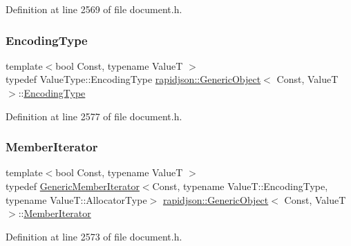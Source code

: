 Definition at line 2569 of file document.\+h.

\mbox{\label{classrapidjson_1_1_generic_object_ac412c8d073aa02f622b3904e4195425c}} 
\subsubsection{\texorpdfstring{EncodingType}{EncodingType}}
{\footnotesize\ttfamily template$<$bool Const, typename ValueT $>$ \\
typedef Value\+Type\+::\+Encoding\+Type \mbox{\hyperlink{classrapidjson_1_1_generic_object}{rapidjson\+::\+Generic\+Object}}$<$ Const, ValueT $>$\+::\mbox{\hyperlink{classrapidjson_1_1_generic_object_ac412c8d073aa02f622b3904e4195425c}{Encoding\+Type}}}



Definition at line 2577 of file document.\+h.

\mbox{\label{classrapidjson_1_1_generic_object_a598fd1d5f55289eca275847f0e8ef295}} 
\subsubsection{\texorpdfstring{MemberIterator}{MemberIterator}}
{\footnotesize\ttfamily template$<$bool Const, typename ValueT $>$ \\
typedef \mbox{\hyperlink{classrapidjson_1_1_generic_member_iterator}{Generic\+Member\+Iterator}}$<$Const, typename Value\+T\+::\+Encoding\+Type, typename Value\+T\+::\+Allocator\+Type$>$ \mbox{\hyperlink{classrapidjson_1_1_generic_object}{rapidjson\+::\+Generic\+Object}}$<$ Const, ValueT $>$\+::\mbox{\hyperlink{classrapidjson_1_1_generic_object_a598fd1d5f55289eca275847f0e8ef295}{Member\+Iterator}}}



Definition at line 2573 of file document.\+h.

